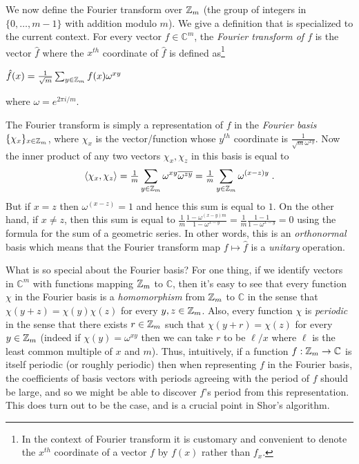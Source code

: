 We now define the Fourier transform over \({\mathbb{Z}}_m\) (the group of integers
in \(\{0,\ldots,m-1\}\) with addition modulo \(m\)). We give a
definition that is specialized to the current context. For every vector
\(f\in\mathbb{C}^m\), the \emph{Fourier transform of \(f\)} is the
vector \(\hat{f}\) where the \(x^{th}\) coordinate of \(\hat{f}\) is
defined as\footnote{In the context of Fourier transform it is customary
  and convenient to denote the \(x^{th}\) coordinate of a vector \(f\)
  by \(f(x)\) rather than \(f_x\).}

\(\hat{f}(x) = \tfrac{1}{\sqrt{m}}\sum_{y\in{\mathbb{Z}}_m} f(x)\omega^{xy}\)

where \(\omega = e^{2\pi i/m}\).

The Fourier transform is simply a representation of \(f\) in the
\emph{Fourier basis} \(\{ \chi_x \}_{x \in {\mathbb{Z}}_m}\), where \(\chi_x\) is
the vector/function whose \(y^{th}\) coordinate is
\(\tfrac{1}{\sqrt{m}\omega^{xy}}\). Now the inner product of any two
vectors \(\chi_x,\chi_z\) in this basis is equal to
\begin{equation*}
\langle \chi_x,\chi_z \rangle = \tfrac{1}{m}\sum_{y\in{\mathbb{Z}}_m} \omega^{xy} \overline{\omega^{zy}} = \tfrac{1}{m}\sum_{y\in{\mathbb{Z}}_m} \omega^{(x-z)y}  \;.
\end{equation*}
But if \(x=z\) then \(\omega^{(x-z)}=1\) and hence this sum is equal to
\(1\). On the other hand, if \(x \neq z\), then this sum is equal to
\(\tfrac{1}{m} \tfrac{1 -\omega^{(x-y)m}}{1-\omega^{x-y}}= \tfrac{1}{m}\tfrac{1-1}{1-\omega^{x-y}}=0\)
using the formula for the sum of a geometric series. In other words,
this is an \emph{orthonormal} basis which means that the Fourier
transform map \(f \mapsto \hat{f}\) is a \emph{unitary} operation.

What is so special about the Fourier basis? For one thing, if we
identify vectors in \(\mathbb{C}^m\) with functions mapping \({\mathbb{Z}}_m\) to
\(\mathbb{C}\), then it's easy to see that every function \(\chi\) in
the Fourier basis is a \emph{homomorphism} from \({\mathbb{Z}}_m\) to
\(\mathbb{C}\) in the sense that \(\chi(y+z)= \chi(y)\chi(z)\) for every
\(y,z \in {\mathbb{Z}}_m\). Also, every function \(\chi\) is \emph{periodic} in
the sense that there exists \(r\in {\mathbb{Z}}_m\) such that
\(\chi(y+r)=\chi(z)\) for every \(y\in {\mathbb{Z}}_m\) (indeed if
\(\chi(y) = \omega^{xy}\) then we can take \(r\) to be \(\ell/x\) where
\(\ell\) is the least common multiple of \(x\) and \(m\)). Thus,
intuitively, if a function \(f:{\mathbb{Z}}_m\rightarrow\mathbb{C}\) is itself
periodic (or roughly periodic) then when representing \(f\) in the
Fourier basis, the coefficients of basis vectors with periods agreeing
with the period of \(f\) should be large, and so we might be able to
discover \(f\)'s period from this representation. This does turn out to
be the case, and is a crucial point in Shor's algorithm.

